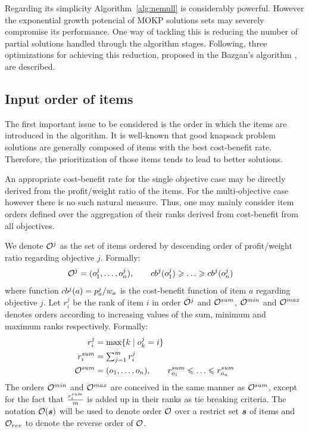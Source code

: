 Regarding its simplicity Algorithm~\ref{alg:nemull} is considerably powerful.
However the exponential growth potencial of MOKP solutions sets
may severely compromise its performance.
One way of tackling this is reducing the number of partial solutions
handled through the algorithm stages.
Following, three optimizations for achieving this  reduction, proposed in the
Bazgan's algorithm  \cite{bazgan2009}, are described.

\subsection{Input order of items}
\label{subsec:order}
The first important issue to be considered is the order
in which the items are introduced in the algorithm.
It is well-known that good knapsack problem solutions
are generally composed of items with the best cost-benefit rate.
Therefore, the prioritization of those items tends to lead to better solutions.

An appropriate cost-benefit rate for the single objective case may be directly derived
from the profit/weight ratio of the items.
For the multi-objective case however there is no such natural measure.
Thus, one may mainly consider item orders defined over the aggregation of their ranks
derived from cost-benefit from all objectives.

We denote $\mathcal{O}^j$ as the set of items ordered by descending order of profit/weight
ratio regarding objective $j$.
Formally:
\begin{align*}
  \mathcal{O}^j &= (o^j_1, \ldots, o^j_n) , \qquad cb^{j}(o^j_1) \geqslant \ldots \geqslant cb^{j}(o^j_n)
\end{align*}
where function $cb^{j}(a) = {p^j_a}/{w_a}$ is the
cost-benefit function of item $a$ regarding objective $j$.
Let $r^j_i$ be the rank of item $i$ in order $\mathcal{O}^j$ and
$\mathcal{O}^{sum}$, $\mathcal{O}^{min}$ and $\mathcal{O}^{max}$ denotes orders according to increasing
values of the sum, minimum and maximum ranks respectively.
Formally:
\begin{align*}
  r^j_i &= \max\{ k \;|\; o^j_k = i \} \\
  r^{sum}_i &= \textstyle\sum^m_{j=1} r^j_i \\
  \mathcal{O}^{sum} &= (o_1, \ldots, o_n) , \qquad r^{sum}_{o_1} \leqslant \ldots \leqslant r^{sum}_{o_n}
\end{align*}
The orders $\mathcal{O}^{min}$ and $\mathcal{O}^{max}$ are conceived in the same manner as
$\mathcal{O}^{sum}$, except for the fact that $\frac{r^{sum}_i}{m}$ is added up
in their ranks as tie breaking criteria.
The notation $\mathcal{O}(\boldsymbol{s})$ will be used to denote order $\mathcal{O}$
over a restrict set $\boldsymbol{s}$ of items and $\mathcal{O}_{rev}$ to denote the reverse
order of $\mathcal{O}$.

